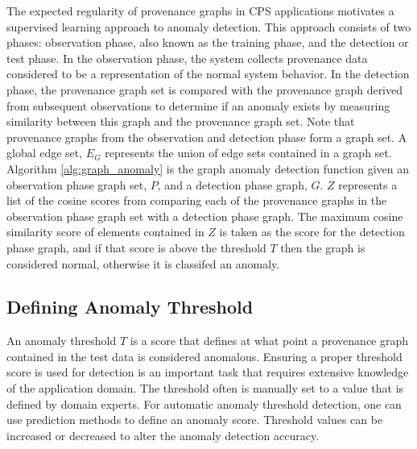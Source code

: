 \par The expected regularity of provenance graphs in CPS applications motivates a supervised learning approach to anomaly detection. This approach consists of two phases: observation phase, also known as the training phase, and the detection or test phase. In the observation phase, the system collects provenance data considered to be a representation of the normal system behavior. In the detection phase, the provenance graph set is compared with the provenance graph derived from subsequent observations to determine if an anomaly exists by measuring similarity between this graph and the provenance graph set. Note that provenance graphs from the observation and detection phase form a graph set. A global edge set, $E_G$ represents the union of edge sets contained in a graph set. Algorithm \ref{alg:graph_anomaly} is the graph anomaly detection function given an observation phase graph set, $P$, and a detection phase graph, $G$. $Z$ represents a list of the cosine scores from comparing each of the provenance graphs in the observation phase graph set with a detection phase graph. The maximum cosine similarity score of elements contained in $Z$ is taken as the score for the detection phase graph, and if that score is above the threshold $T$ then the graph is considered normal, otherwise it is classifed an anomaly.

\subsection{Defining Anomaly Threshold}

An anomaly threshold $T$ is a score that defines at what point a provenance graph contained in the test data is considered anomalous. Ensuring a proper threshold score is used for detection is an important task that requires extensive knowledge of the application domain. The threshold often is manually set to a value that is defined by domain experts. For automatic anomaly threshold detection, one can use prediction methods to define an anomaly score. Threshold values can be increased or decreased to alter the anomaly detection accuracy.




